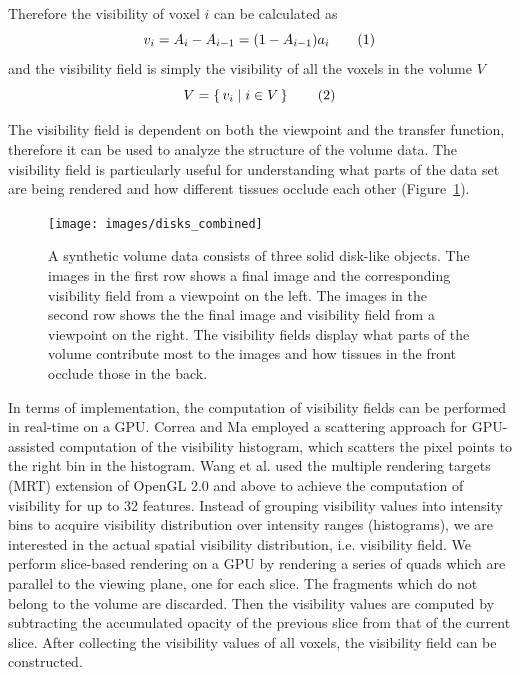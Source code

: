 Therefore the visibility of voxel $ i $ can be calculated as
\[ v_{i}=A_{i}-A_{i-1}=(1-A_{i-1})a_{i} 
\addtag \]
and the visibility field is simply the visibility of all the voxels in the volume $ V $
\[ V=\set{v_{i}|i \in V} 
\addtag \]

The visibility field is dependent on both the viewpoint and the transfer function, therefore it can be used to analyze the structure of the volume data. The visibility field is particularly useful for understanding what parts of the data set are being rendered and how different tissues occlude each other (Figure~\ref{fig:disks_combined}).

\begin{figure}
	\centering
	\texttt{[image: images/disks\_combined]}
	\caption{A synthetic volume data consists of three solid disk-like objects. The images in the first row shows a final image and the corresponding visibility field from a viewpoint on the left.
		The images in the second row shows the the final image and visibility field from a viewpoint on the right.
		The visibility fields display what parts of the volume contribute most to the images and how tissues in the front occlude those in the back.}
	\label{fig:disks_combined}
\end{figure}

In terms of implementation, the computation of visibility fields can be performed in real-time on a GPU.
Correa and Ma \cite{correa_visibility_2011} employed a scattering approach for GPU-assisted computation of the visibility histogram, which scatters the pixel points to the right bin in the histogram. Wang et al. \cite{wang_efficient_2011} used the multiple rendering targets (MRT) extension of OpenGL 2.0 and above to achieve the computation of visibility for up to 32 features.
Instead of grouping visibility values into intensity bins to acquire visibility distribution over intensity ranges (histograms), we are interested in the actual spatial visibility distribution, i.e. visibility field. We perform slice-based rendering on a GPU by rendering a series of quads which are parallel to the viewing plane, one for each slice. The fragments which do not belong to the volume are discarded. Then the visibility values are computed by subtracting the accumulated opacity of the previous slice from that of the current slice. After collecting the visibility values of all voxels, the visibility field can be constructed.

